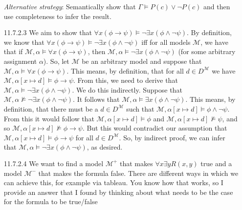 \begin{itemize}
            \emph{Alternative strategy}: Semantically show that
                $\Gamma\vDash P(c)\lor\neg P(c)$ and then use
                completeness to infer the result.

          \item[11.7.2.3] We aim to show that
            $\forall x(\phi\to\psi)\vDash\neg \exists x(\phi\land
            \neg\psi)$.
            By definition, we know that
            $\forall x(\phi\to\psi)\vDash\neg \exists x(\phi\land \neg\psi)$
            iff for all models $\mathcal{M}$,
            we have that if
            $\mathcal{M},\alpha\vDash \forall x(\phi\to\psi)$, then
            $\mathcal{M},\alpha\vDash\neg \exists x(\phi\land\neg\psi)$
            (for some arbitrary assignment $\alpha$).
            So, let $\mathcal{M}$ be an
            arbitrary model and suppose that
            $\mathcal{M},\alpha\vDash\forall x(\phi\to\psi)$.
            This means, by definition, that for all
            $d\in D^\mathcal{M}$ we have
            $\mathcal{M},\alpha[x\mapsto d]\vDash
            \phi\to\psi$.
            From this, we need to derive that
            $\mathcal{M},\alpha\vDash\neg \exists x
            (\phi\land\neg\psi)$.
            We do this indirectly.
            Suppose
            that $\mathcal{M},\alpha\nvDash\neg \exists x
            (\phi\land\neg\psi)$.
            It follows that  $\mathcal{M},\alpha\vDash \exists x
            (\phi\land\neg\psi)$.
            This means, by definition,
            that there must be a $d\in D^\mathcal{M}$ such that
            $\mathcal{M},\alpha[x\mapsto d]\vDash
            \phi\land\neg\psi$.
            From this it would follow
            that $\mathcal{M},\alpha[x\mapsto d]\vDash
            \phi$ and $\mathcal{M},\alpha[x\mapsto
            d]\nvDash\psi$, and so $\mathcal{M},\alpha[x\mapsto d]\nvDash
            \phi\to\psi$.
            But this would contradict our
            assumption that  $\mathcal{M},\alpha[x\mapsto d]\vDash
            \phi\to\psi$ for all $d\in D^\mathcal{M}$.
            So, by
            indirect proof, we can infer that  $\mathcal{M},\alpha\vDash\neg
            \exists x(\phi\land\neg\psi)$, as desired.
                  
                  \item[11.7.2.4] We want to find a model
                    $\mathcal{M}^+$ that makes
                    $\forall x\exists yR(x,y)$ true and a model
                    $\mathcal{M}^-$ that makes the formula
                    false. There are different ways in which
                    we can achieve this, for example via tableau. You
                    know how that works, so I provide an answer that
                    I found by thinking about what needs to be the
                    case for the formula to be true/false


\end{itemize}
